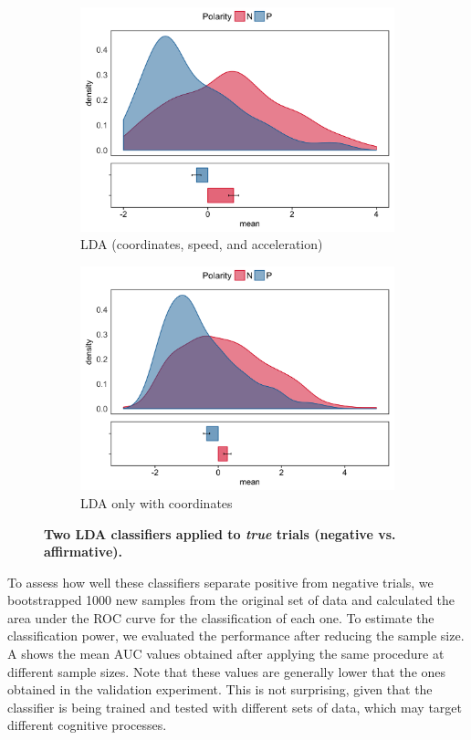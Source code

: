 \documentclass[draft]{article}
\begin{document}
\begin{figure}
\centering
\begin{subfigure}[b]{0.45\textwidth}
\includegraphics[width=\textwidth]{OriginalLDA-negation.png}
\caption{LDA (coordinates, speed, and acceleration) }
\end{subfigure}
\begin{subfigure}[b]{0.45\textwidth}
\includegraphics[width=\textwidth]{CoordsLDA-negation.png}
\caption{LDA only with coordinates}
\end{subfigure}
\caption{\textbf{Two LDA classifiers applied to \textit{true} trials (negative vs. affirmative).}  }
\label{fig:lda_negation}
\end{figure}

To assess how well these classifiers separate positive from negative trials, we bootstrapped 1000 new samples from the original set of data and calculated the area under the ROC curve for the classification of each one. 
To estimate the classification power, we evaluated the performance after reducing the sample size. A shows the mean AUC values obtained after applying the same procedure at different sample sizes. 
Note that these values are generally lower that the ones obtained in the validation experiment. This is not surprising, given that the classifier is being trained and tested with different sets of data, which may target different cognitive processes. 
\end{document}

